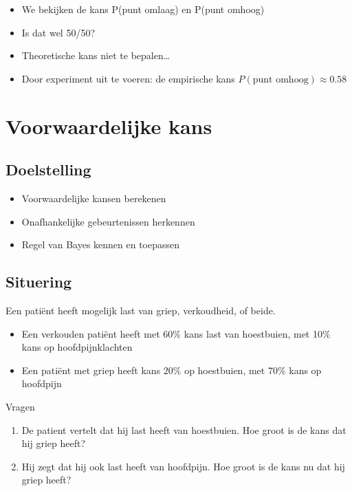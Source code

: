 \documentclass{article}
\begin{document}
\begin{itemize}
    \item We bekijken de kans P(punt omlaag) en P(punt omhoog)
    \item Is dat wel 50/50?
    \item Theoretische kans niet te bepalen\dots
    \item Door experiment uit te voeren: de empirische kans $P(\text{punt omhoog}) \approx 0.58$
\end{itemize}

\section{Voorwaardelijke kans}

\subsection{Doelstelling}

\begin{itemize}
    \item Voorwaardelijke kansen berekenen
    \item Onafhankelijke gebeurtenissen herkennen
    \item Regel van Bayes kennen en  toepassen
\end{itemize}

\subsection{Situering}

Een patiënt heeft mogelijk last van griep, verkoudheid, of beide.

\begin{itemize}
    \item Een verkouden patiënt heeft met 60\% kans last van hoestbuien, met 10\% kans op hoofdpijnklachten
    \item Een patiënt met griep heeft kans 20\% op hoestbuien, met 70\% kans op hoofdpijn
\end{itemize}

Vragen

\begin{enumerate}
    \item De patient vertelt dat hij last heeft van hoestbuien. Hoe groot is de kans dat hij griep heeft?
    \item Hij zegt dat hij ook last heeft van hoofdpijn. Hoe groot is de kans nu dat hij griep heeft?
\end{enumerate}
\end{document}
